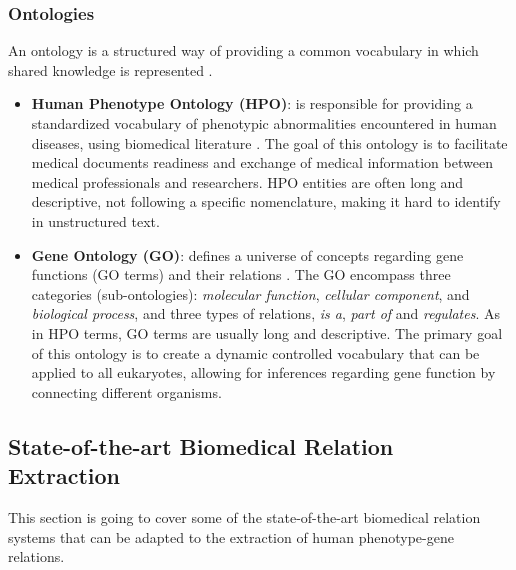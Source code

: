 \documentclass[11pt]{article}
\begin{document}

\subsubsection{Ontologies}

An ontology is a structured way of providing a common vocabulary in which shared knowledge is represented \cite{Gruber}.

\begin{itemize}

\item{\textbf{Human Phenotype Ontology (HPO)}: is responsible for providing a standardized vocabulary of phenotypic abnormalities encountered in human diseases, using biomedical literature \cite{HPO}. The goal of this ontology is to facilitate medical documents readiness and exchange of medical information between medical professionals and researchers. HPO entities are often long and descriptive, not following a specific nomenclature, making it hard to identify in unstructured text.}

\item{\textbf{Gene Ontology (GO)}: defines a universe of concepts regarding gene functions (GO terms) and their relations \cite{PMID:10802651}. The GO encompass three categories (sub-ontologies): \textit{molecular function}, \textit{cellular component}, and \textit{biological process}, and three types of relations, \textit{is a}, \textit{part of} and \textit{regulates}. As in HPO terms, GO terms are usually long and descriptive. The primary goal of this ontology is to create a dynamic controlled vocabulary that can be applied to all eukaryotes, allowing for inferences regarding gene function by connecting different organisms.}


\end{itemize}


\subsection{State-of-the-art Biomedical Relation Extraction}

This section is going to cover some of the state-of-the-art biomedical relation systems that can be adapted to the extraction of human phenotype-gene relations.

\end{document}
